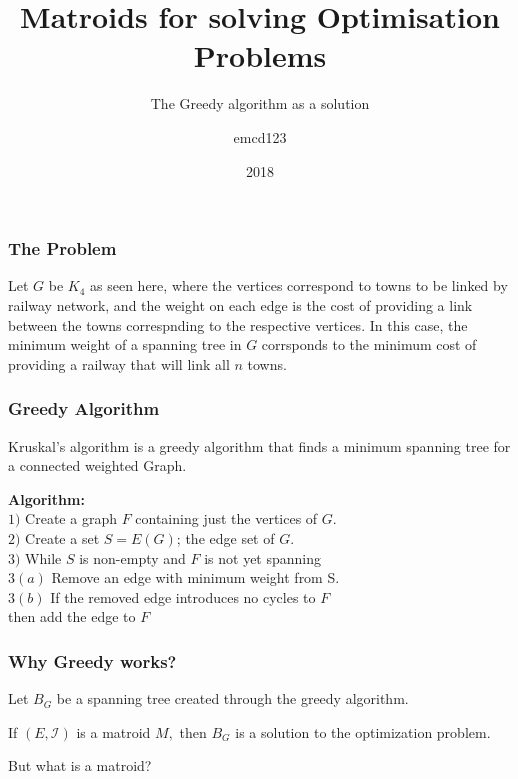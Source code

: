 \documentclass{beamer}
\title[Matroids] %
{Matroids for solving Optimisation Problems}
\subtitle{The Greedy algorithm as a solution}
\author{emcd123}
\institute{NUI Galway}
\date{2018}
\newcommand\Algorithm{%
  \textbf{Algorithm:}\\%
}
\begin{document}
 
\frame{\titlepage}
 
\begin{frame}
\frametitle{The Problem}
\begin{minipage}{.2\textwidth}
\end{minipage}
\hspace{2.5cm} \begin{minipage}{.5\textwidth}
Let $G$ be $K_4$ as seen here, where the vertices correspond to towns to be linked by railway network, and the weight on each edge is the cost of providing a link between the towns correspnding to the respective vertices. In this case, the minimum weight of a spanning tree in $G$ corrsponds to the minimum cost of providing a railway that will link all $n$ towns.
\end{minipage}
\end{frame}

\begin{frame}
\frametitle{Greedy Algorithm}
Kruskal's algorithm is a greedy algorithm that finds a minimum spanning tree for a connected weighted Graph.

\vspace{4mm}

\Algorithm
$1)$ Create a graph $F$ containing just the vertices of $G.$\\
$2)$ Create a set $S = E(G)$; the edge set of $G.$ \\
$3)$ While $S$ is non-empty and $F$ is not yet spanning\\
\hspace{5mm} $3(a)$ Remove an edge with minimum weight from S.\\
\hspace{5mm} $3(b)$ If the removed edge introduces no cycles to $F$\\
\hspace{5mm} then add the edge to $F$\\
	


\end{frame}

\begin{frame}
\frametitle{Why Greedy works?}

Let $B_G$ be a spanning tree created through the greedy algorithm.
\begin{lemma}
If $(E,\mathcal{I})$ is a matroid $M,$ then $B_G$ is a solution to the optimization problem.
\end{lemma}

\vspace{5mm}

But what is a matroid?

\end{frame}
\end{document}
